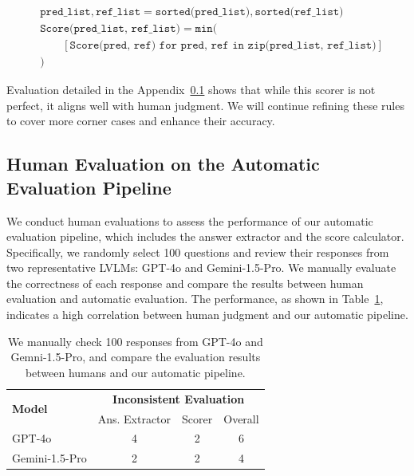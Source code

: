 \begin{equation}
    \label{eq:list_score}
    \begin{aligned}
    & \texttt{pred\_list}, \texttt{ref\_list}  = \texttt{sorted(pred\_list)}, \texttt{sorted(ref\_list)}   \\
    & \texttt{Score(pred\_list, ref\_list)} = \texttt{min}( \\
    & \quad \quad [\texttt{Score(pred, ref) for pred, ref in zip(pred\_list, ref\_list)}] \\
    & )
    \end{aligned}
\end{equation}

Evaluation detailed in the Appendix~\ref{subsec: Human Evaluation on the Automatic Evaluation Pipeline} shows that while this scorer is not perfect, it aligns well with human judgment. We will continue refining these rules to cover more corner cases and enhance their accuracy.

\subsection{Human Evaluation on the Automatic Evaluation Pipeline}
\label{subsec: Human Evaluation on the Automatic Evaluation Pipeline}
We conduct human evaluations to assess the performance of our automatic evaluation pipeline, which includes the answer extractor and the score calculator. Specifically, we randomly select 100 questions and review their responses from two representative LVLMs: GPT-4o and Gemini-1.5-Pro. We manually evaluate the correctness of each response and compare the results between human evaluation and automatic evaluation. The performance, as shown in Table~\ref{tab:eval_compare}, indicates a high correlation between human judgment and our automatic pipeline.

\begin{table}[!htbp]
    \centering
    \begin{tabular}{l|ccc}
    \toprule
        \multirow{2}{*}{\textbf{Model}} & \multicolumn{3}{c}{\textbf{Inconsistent Evaluation}} \\
         & Ans. Extractor & Scorer & Overall \\
         \midrule
        GPT-4o & 4 & 2 & 6 \\
        Gemini-1.5-Pro & 2 & 2 & 4 \\
        \bottomrule
    \end{tabular}
    \vspace{1em}
    \caption{We manually check 100 responses from GPT-4o and Gemni-1.5-Pro, and compare the evaluation results between humans and our automatic pipeline.}
    \label{tab:eval_compare}
\end{table}

